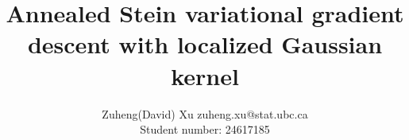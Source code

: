\documentclass[11pt]{article}
\begin{document}
\title{Annealed Stein variational gradient descent with localized Gaussian kernel}

\author{\name Zuheng(David) Xu \email zuheng.xu@stat.ubc.ca \\
       \addr Student number: 24617185\\}      


\maketitle





% 




\newpage




\newpage
\appendix

\end{document}

